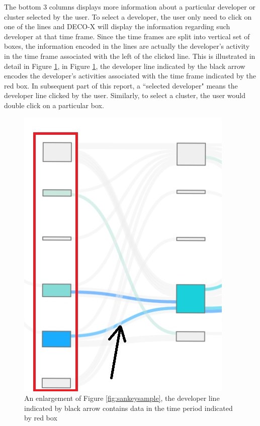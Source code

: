 \documentclass{article}
\begin{document}
The bottom 3 columns displays more information about a particular developer or cluster selected by the user. To select a developer, the user only need to click on one of the lines and DECO-X will display the information regarding such developer at that time frame. Since the time frames are split into vertical set of boxes, the information encoded in the lines are actually the developer's activity in the time frame associated with the left of the clicked line. This is illustrated in detail in Figure \ref{fig:sankeysampledetail}, in Figure \ref{fig:sankeysampledetail}, the developer line indicated by the black arrow encodes the developer's activities associated with the time frame indicated by the red box. In subsequent part of this report, a ``selected developer" means the developer line clicked by the user. Similarly, to select a cluster, the user would double click on a particular box.\\

\begin{figure}[h!]
\centering
\includegraphics[scale=1]{images/InkedsankeySampleDetail.jpg}
\caption{An enlargement of Figure \ref{fig:sankeysample}, the developer line indicated by black arrow contains data in the time period indicated by red box}
\label{fig:sankeysampledetail}
\end{figure}
\end{document}

